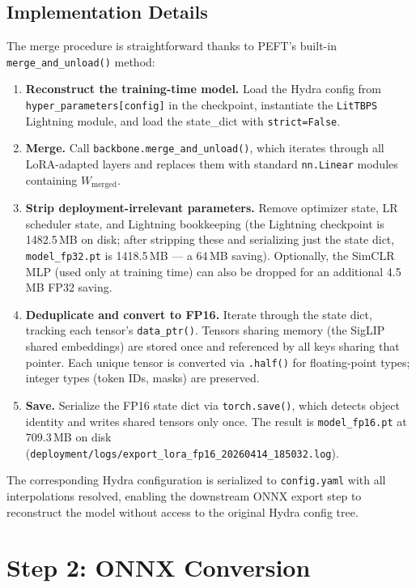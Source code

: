 \documentclass[../main.tex]{subfiles}
\begin{document}
\subsection{Implementation Details}

\noindent The merge procedure is straightforward thanks to PEFT's built-in \texttt{merge\_and\_unload()} method:

\begin{enumerate}
    \item \textbf{Reconstruct the training-time model.} Load the Hydra config from \texttt{hyper\_parameters[\textquotesingle config\textquotesingle]} in the checkpoint, instantiate the \texttt{LitTBPS} Lightning module, and load the state\_dict with \texttt{strict=False}.
    \item \textbf{Merge.} Call \texttt{backbone.merge\_and\_unload()}, which iterates through all LoRA-adapted layers and replaces them with standard \texttt{nn.Linear} modules containing $W_{\text{merged}}$.
    \item \textbf{Strip deployment-irrelevant parameters.} Remove optimizer state, LR scheduler state, and Lightning bookkeeping (the Lightning checkpoint is 1482.5\,MB on disk; after stripping these and serializing just the state dict, \texttt{model\_fp32.pt} is 1418.5\,MB --- a 64\,MB saving). Optionally, the SimCLR MLP (used only at training time) can also be dropped for an additional 4.5\,MB FP32 saving.
    \item \textbf{Deduplicate and convert to FP16.} Iterate through the state dict, tracking each tensor's \texttt{data\_ptr()}. Tensors sharing memory (the SigLIP shared embeddings) are stored once and referenced by all keys sharing that pointer. Each unique tensor is converted via \texttt{.half()} for floating-point types; integer types (token IDs, masks) are preserved.
    \item \textbf{Save.} Serialize the FP16 state dict via \texttt{torch.save()}, which detects object identity and writes shared tensors only once. The result is \texttt{model\_fp16.pt} at 709.3\,MB on disk (\texttt{deployment/logs/export\_lora\_fp16\_20260414\_185032.log}).
\end{enumerate}

\noindent The corresponding Hydra configuration is serialized to \texttt{config.yaml} with all interpolations resolved, enabling the downstream ONNX export step to reconstruct the model without access to the original Hydra config tree.

\section{Step 2: ONNX Conversion}
\label{sec:step2_onnx}
\end{document}
